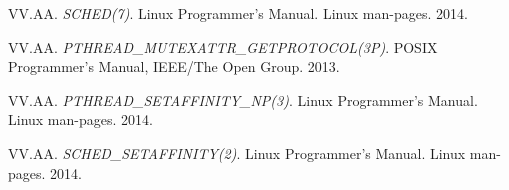 \documentclass[paper=a4, fontsize=11pt]{scrartcl}
\numberwithin{equation}{section}        %
\numberwithin{figure}{section}          %
\numberwithin{table}{section}               %
\numberwithin{fragment}{section}
\begin{document}
\begin{thebibliography}{99}

  VV.AA.
  \textit{SCHED(7)}.
  Linux Programmer's Manual.
  Linux man-pages.
  2014.

  VV.AA.
  \textit{PTHREAD\_MUTEXATTR\_GETPROTOCOL(3P)}.
  POSIX Programmer's Manual,
  IEEE/The Open Group.
  2013.

  VV.AA.
  \textit{PTHREAD\_SETAFFINITY\_NP(3)}.
  Linux Programmer's Manual.
  Linux man-pages.
  2014.

  VV.AA.
  \textit{SCHED\_SETAFFINITY(2)}.
  Linux Programmer's Manual.
  Linux man-pages.
  2014.

\end{thebibliography}




\end{document}
